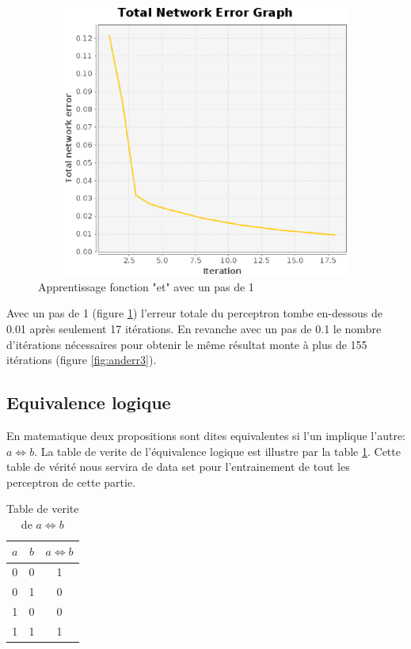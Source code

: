 \documentclass[twoside,openright,a4paper,11pt,french]{article}
\begin{document}
\begin{figure}[ht]
\centering
\includegraphics[width=12cm,height=9cm]{./pics/and_error4.eps}
\caption{Apprentissage fonction "et" avec un pas de 1}
\label{fig:anderr4}
\end{figure}

Avec un pas de 1 (figure \ref{fig:anderr4}) l'erreur totale du perceptron
tombe en-dessous de 0.01 après seulement 17 itérations. En revanche avec 
un pas de 0.1 le nombre d'itérations nécessaires pour obtenir le même
résultat monte à plus de 155 itérations (figure \ref{fig:anderr3}).

\subsection{Equivalence logique}
En matematique deux propositions sont dites equivalentes si l'un implique
l'autre: $a \Leftrightarrow b$. La table de verite de l'équivalence logique
est illustre par la table \ref{tab:eq}.
Cette table de vérité nous servira de data set pour l'entrainement de tout
les perceptron de cette partie.


\begin{table}[ht]
  \centering
  \begin{tabular}{| c | c | c |}
    \hline
    \textbf{$a$} & \textbf{$b$} & \textbf{$a \Leftrightarrow b$}\\
    \hline
    0 & 0  & 1 \\
    \hline
    0 & 1  & 0 \\
    \hline
    1 & 0  & 0 \\
    \hline
    1 & 1  & 1 \\
    \hline
  \end{tabular}
  \caption{Table de verite de $a \Leftrightarrow b$}
  \label{tab:eq}
\end{table}
\end{document}
